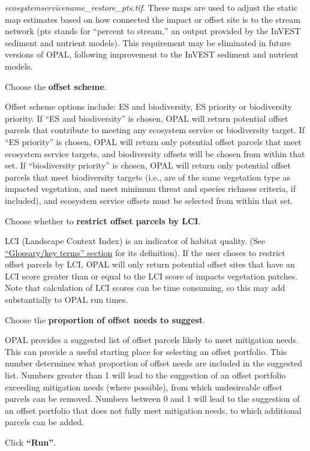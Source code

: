 \documentclass[11pt,letterpaper]{report}
\newenvironment{myenumerate}{%
	\edef\backupindent{\the\parindent}
	\enumerate
	\setlength{\parindent}{\backupindent}
		\setlist[enumerate,1]{label=(\arabic*)}
		\setlist[enumerate,2]{label=(\arabic*)}
}{\endenumerate}
\begin{document}
\begin{myenumerate}
\begin{enumerate}[label=\alph*.]
\begin{enumerate}[label=(\arabic*),leftmargin=0.5in,labelindent=!,itemindent=-0.02in]
					{\em ecosystemservicename\_{}restore\_{}pts.tif}. These maps are used to adjust the static map estimates based on how connected the impact or offset site is to the stream network (pts stands for ``percent to stream,'' an output provided by the InVEST sediment and nutrient models). This requirement may be eliminated in future versions of OPAL, following improvement to the InVEST sediment and nutrient models.
					
				\end{enumerate}
				
			\end{enumerate}	
		
		\item Choose the \textbf{offset scheme}.
		
			Offset scheme options include: ES and biodiversity, ES priority or biodiversity priority. If ``ES and biodiversity'' is chosen, OPAL will return potential offset parcels that contribute to meeting any ecosystem service or biodiversity target. If ``ES priority'' is chosen, OPAL will return only potential offset parcels that meet ecosystem service targets, and biodiversity offsets will be chosen from within that set. If ``biodiversity priority'' is chosen, OPAL will return only potential offset parcels that meet biodiversity targets (i.e., are of the same vegetation type as impacted vegetation, and meet minimum threat and species richness criteria, if included), and ecosystem service offsets must be selected from within that set.
		
		\item Choose whether to \textbf{restrict offset parcels by LCI}.
		
			LCI (Landscape Context Index) is an indicator of habitat quality. (See \hyperref[ch:glossary]{``Glossary/key terms'' section} for its definition). If the user choses to restrict offset parcels by LCI, OPAL will only return potential offset sites that have an LCI score greater than or equal to the LCI score of impacts vegetation patches. Note that calculation of LCI scores can be time consuming, so this may add substantially to OPAL run times.
		
		\item Choose the \textbf{proportion of offset needs to suggest}.
		
			OPAL provides a suggested list of offset parcels likely to meet mitigation needs. This can provide a useful starting place for selecting an offset portfolio. This number determines what proportion of offset needs are included in the suggested list. Numbers greater than 1 will lead to the suggestion of an offset portfolio exceeding mitigation needs (where possible), from which undesireable offset parcels can be removed. Numbers between 0 and 1 will lead to the suggestion of an offset portfolio that does not fully meet mitigation needs, to which additional parcels can be added.
			
		\item Click \textbf{``Run''}.		
		
	\end{myenumerate}
\end{document}

